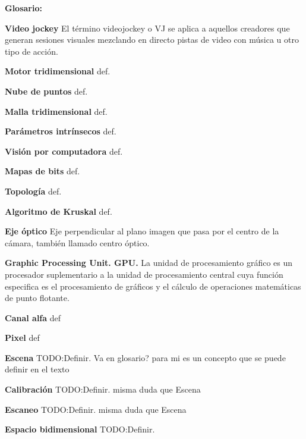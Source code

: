 ﻿\Huge
\textbf{Glosario:}




\normalsize 
\textbf{Video jockey}
 El término videojockey o VJ se aplica a aquellos creadores que generan sesiones visuales mezclando en directo pistas de video con música u otro tipo de acción.


\textbf{Motor tridimensional}
 def.

 
\textbf{Nube de puntos}
 def.


\textbf{Malla tridimensional}
def.


\textbf{Parámetros intrínsecos}
def.


\textbf{Visión por computadora}
def.

 
\textbf{Mapas de bits}
def.


\textbf{Topología}
 def.

 
\textbf{Algoritmo de Kruskal}
 def.
  
  
\textbf{Eje óptico} 
 Eje perpendicular al plano imagen que pasa por el centro de la cámara, también llamado centro óptico.
 
 
\textbf{Graphic Processing Unit. GPU.}
 La unidad de procesamiento gráfico es un procesador suplementario a la unidad de procesamiento central cuya función especifica es el procesamiento de gráficos y el cálculo de operaciones matemáticas de punto flotante.

 
\textbf{Canal alfa}
 def 

 
\textbf{Pixel}
def
 
 
 


\textbf{Escena}
 TODO:Definir. Va en glosario? para mi es un concepto que se puede definir en el texto

 
\textbf{Calibración}
 TODO:Definir. misma duda que Escena

 
\textbf{Escaneo}
 TODO:Definir. misma duda que Escena

 
\textbf{Espacio bidimensional}
 TODO:Definir.

 


 


 


